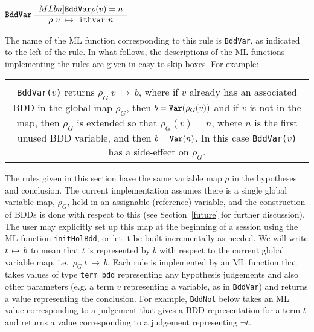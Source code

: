 \documentclass[12pt]{article}
\newcommand{\bnind}[1]{\index[MLbn]{#1}}
\newlength{\minipagewidth}
\newcommand{\ty}[1]{\mbox{\tt #1}}
\newcommand{\ml}[1]{{\tt #1}}
\newcommand{\termbdd}[3]{\mbox{$#1~#2~\mapsto~#3$}}
\newcommand{\globtermbdd}[2]{\mbox{$#1\hspace{0.5mm}\mapsto\hspace{0.5mm}#2$}}
\newcommand\termbddty{\ty{term\_bdd}}
\newcommand\fun{\mbox{\tt{->}}}
\begin{document}
\smallskip

$\ml{BddVar}~\begin{array}{c}  \bnind{\ml{BddVar}}
\rho(v)=n
\\ \hline
\termbdd{\rho}{v}{\ml{ithvar~}n}
\end{array}$
\smallskip

The name of the ML function corresponding to this rule is \ml{BddVar},
as indicated to the left of the rule. 
In what follows, the descriptions of the ML functions
implementing the rules 
are given in easy-to-skip boxes. For example:


\vspace*{-4mm}
\begin{flushleft}
\begin{tabular}{|c|}\hline
\begin{minipage}{\minipagewidth}
\smallskip
\begin{footnotesize}
\begin{description}

\item $\ml{BddVar}:\ty{term}\fun\termbddty$\\
\ml{BddVar($v$)} returns $\termbdd{\rho_G}{v}{b}$, where if $v$ already has an associated BDD 
in the global map $\rho_G$, 
then $b = \ml{Var}(\rho_G(v))$  and if $v$ is not in the map, then $\rho_G$ is extended
so that $\rho_G(v)=n$, where $n$ is the
first unused BDD variable, and then
$b=\ml{Var}(n)$. In this case \ml{BddVar($v$)} has a side-effect
on $\rho_G$.


\end{description}
\end{footnotesize}
\smallskip
\end{minipage}\\ \hline
\end{tabular}
\end{flushleft}

The rules given in this section have the same variable map $\rho$ in the
hypotheses and conclusion. The current implementation assumes there is
a single global variable map, $\rho_G$, held in an assignable
(reference) variable, and the construction of BDDs is done with
respect to this (see Section~\ref{future} for further discussion). The
user may explicitly set up this map at the beginning of a session using
the ML function \ml{initHolBdd}\bnind{\ml{initHolBdd}}, or
let it be built incrementally as needed.  We will write
$\globtermbdd{t}{b}$ to mean that $t$ is represented by $b$ with
respect to the current global variable map,
i.e.~$\termbdd{\rho_G}{t}{b}$. Each rule
is implemented by an ML function that takes
values of type \termbddty{} representing any hypothesis judgements
and also other parameters (e.g. a term $v$ representing a variable, as in \ml{BddVar})
and returns a value representing the
conclusion. 
For example, \ml{BddNot}\bnind{\ml{BddNot}} below takes an ML value corresponding
to a judgement that gives a BDD representation for a term $t$ and
returns a value corresponding to a judgement representing $\neg t$.
\end{document}
